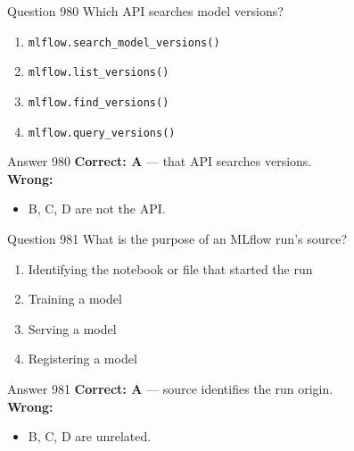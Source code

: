 \documentclass[aspectratio=169,11pt]{beamer}
\begin{document}
	\begin{frame}{Question 980}
		Which API searches model versions?
		\begin{enumerate}[label=\Alph*.]
			\item \texttt{mlflow.search\_model\_versions()}
			\item \texttt{mlflow.list\_versions()}
			\item \texttt{mlflow.find\_versions()}
			\item \texttt{mlflow.query\_versions()}
		\end{enumerate}
	\end{frame}
	\begin{frame}{Answer 980}
		\textbf{Correct: A} --- that API searches versions.\\
		\vspace{0.5em}
		\textbf{Wrong:}
		\begin{itemize}
			\item B, C, D are not the API.
		\end{itemize}
	\end{frame}
	
	\begin{frame}{Question 981}
		What is the purpose of an MLflow run's source?
		\begin{enumerate}[label=\Alph*.]
			\item Identifying the notebook or file that started the run
			\item Training a model
			\item Serving a model
			\item Registering a model
		\end{enumerate}
	\end{frame}
	\begin{frame}{Answer 981}
		\textbf{Correct: A} --- source identifies the run origin.\\
		\vspace{0.5em}
		\textbf{Wrong:}
		\begin{itemize}
			\item B, C, D are unrelated.
		\end{itemize}
	\end{frame}
	
\end{document}
